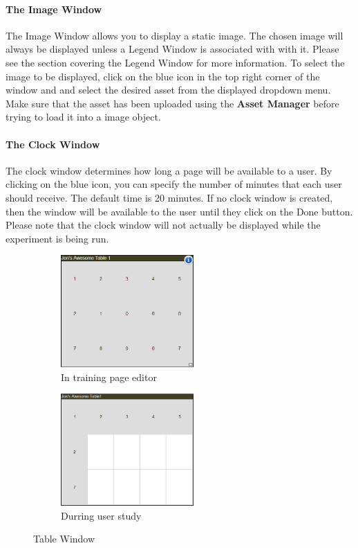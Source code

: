 \documentclass[article]{ij4uq}              %
\begin{document}
\paragraph{The Image Window}
The Image Window allows you to display a static image.  The chosen image will always be displayed unless a Legend Window is associated with with it.  Please see the section covering the Legend Window for more information.  To select the image to be displayed, click on the blue icon in the top right corner of the window and and select the desired asset from the displayed dropdown menu.  Make sure that the asset has been uploaded using the \textbf{Asset Manager} before trying to load it into a image object.

\paragraph{The Clock Window}
The clock window determines how long a page will be available to a user. By clicking on the blue icon, you can specify the number of minutes that each user should receive. The default time is 20 minutes. If no clock window is created, then the window will be available to the user until they click on the Done button. Please note that the clock window will not actually be displayed while the experiment is being run.

\begin{figure}[h!]
 \centering
 \begin{subfigure}[b]{0.4\textwidth}
    \centering
    \includegraphics[width=2.0in]{figures/table_uncovered.png}
    \caption{In training page editor}
    \label{fig:tableUN}
 \end{subfigure}
 \begin{subfigure}[b]{0.4\textwidth}
    \centering
    \includegraphics[width=2.0in]{figures/table_covered.png}
    \caption{Durring user study}
    \label{fig:tableCV}
 \end{subfigure}
 \caption{Table Window}
 \label{fig:tableWindow}
\end{figure}
\end{document}
